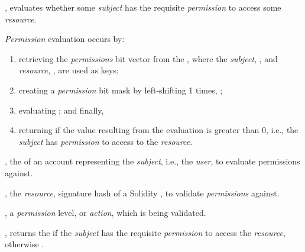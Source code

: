 \begin{code}
  \item \operations

  \begin{functions}
    \item {},
      evaluates whether some \emph{subject} has the requisite \emph{permission}
      to access some \emph{resource}.

      \begin{displayquote}
        \emph{Permission} evaluation occurs by:
        \begin{enumerate}
          \item retrieving the \emph{permissions} bit vector from the
             , where the
            \emph{subject}, , and \emph{resource},
            , are used as keys;

          \item creating a \emph{permission} bit mask by left-shifting 1
             times, ;

          \item evaluating ; and finally,

          \item returning  if the value resulting from the evaluation
            is greater than 0, i.e., the \emph{subject} has \emph{permission} to
            access to the \emph{resource}.
        \end{enumerate}
      \end{displayquote}

      \begin{parameters}
        \item {}, the  of an account
          representing the \emph{subject}, i.e., the \emph{user}, to evaluate
          permissions against.
        \item {}, the \emph{resource}, signature hash of a
          Solidity , to validate \emph{permissions} against.
        \item {}, a \emph{permission} level, or
          \emph{action}, which is being validated.
      \end{parameters}

      \begin{returns}
        \item {}, returns the  if the
          \emph{subject} has the requisite \emph{permission} to access the
          \emph{resource}, otherwise .
      \end{returns}


\end{functions}
\end{code}
